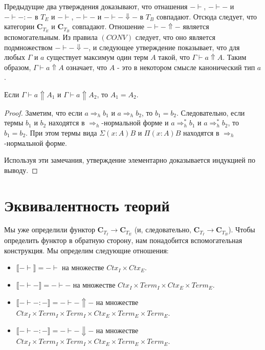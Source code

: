 \documentclass{amsart}
\theoremstyle{definition}
\theoremstyle{remark}
\newcommand{\red}{\Rightarrow}
\renewcommand{\ll}{\llbracket}
\newcommand{\rr}{\rrbracket}
\newcommand{\cat}[1]{\mathbf{#1}}
\renewcommand{\C}{\cat{C}}
\numberwithin{figure}{section}
\begin{document}
Предыдущие два утверждения доказывают, что отнашения $- \vdash$, $- \vdash -$ и $- \vdash - : -$ в $T_E$ и $- \vdash$, $- \vdash -$ и $- \vdash - \Downarrow -$ в $T_B$ совпадают.
Отсюда следует, что категории $\C_{T_E}$ и $\C_{T_B}$ совпадают.
Отношение $- \vdash - \Uparrow -$ является вспомогательным.
Из правила $(CONV)$ следует, что оно является подмножеством $- \vdash - \Downarrow -$,
и следующее утверждение показывает, что для любых $\Gamma$ и $a$ существует максимум один терм $A$ такой, что $\Gamma \vdash a \Uparrow A$.
Таким образом, $\Gamma \vdash a \Uparrow A$ означает, что $A$ - это в некотором смысле канонический тип $a$.

\begin{prop}
Если $\Gamma \vdash a \Uparrow A_1$ и $\Gamma \vdash a \Uparrow A_2$, то $A_1 = A_2$.
\end{prop}
\begin{proof}
Заметим, что если $a \red_h b_1$ и $a \red_h b_2$, то $b_1 = b_2$.
Следовательно, если термы $b_1$ и $b_2$ находятся в $\red_h$-нормальной форме и $a \red^*_h b_1$ и $a \red^*_h b_2$, то $b_1 = b_2$.
При этом термы вида $\Sigma (x : A) B$ и $\Pi (x : A) B$ находятся в $\red_h$-нормальной форме.

Используя эти замечания, утверждение элементарно доказывается индукцией по выводу.
\end{proof}

\section{Эквивалентность теорий}

Мы уже определили функтор $\C_{T_I} \to \C_{T_E}$ (и, следовательно, $\C_{T_I} \to \C_{T_B}$).
Чтобы определить функтор в обратную сторону, нам понадобится вспомогательная конструкция.
Мы определим следующие отношения:
\begin{itemize}
\item $\ll - \vdash \rr = - \vdash$ на множестве $Ctx_I \times Ctx_E$.
\item $\ll - \vdash - \rr = - \vdash -$ на множестве $Ctx_I \times Term_I \times Ctx_E \times Term_E$.
\item $\ll - \vdash - : - \rr = - \vdash - \Uparrow -$ на множестве $Ctx_I \times Term_I \times Term_I \times Ctx_E \times Term_E \times Term_E$.
\item $\ll - \vdash - : - \rr = - \vdash - \Downarrow -$ на множестве $Ctx_I \times Term_I \times Term_I \times Ctx_E \times Term_E \times Term_E$.
\end{itemize}
\end{document}
